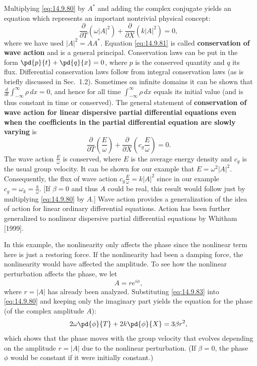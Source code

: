 Multiplying \eqref{eq:14.9.80} by $A^*$ and adding the complex conjugate yields an equation which represents an important nontrivial physical concept:
\begin{equation}
\boxed{\frac{\partial}{\partial T}(\omega|A|^2) + \frac{\partial}{\partial X}(k|A|^2) = 0,}
\label{eq:14.9.81}
\end{equation}
where we have used $|A|^2 = AA^*$. Equation \eqref{eq:14.9.81} is called \textbf{conservation of wave action} and is a general principal. Conservation laws can be put in the form $\pd{p}{t} + \pd{q}{x} = 0$, where $p$ is the conserved quantity and $q$ its flux. Differential conservation laws follow from integral conservation laws (as is briefly discussed in Sec.\ 1.2). Sometimes on infinite domains it can be shown that $\frac{d}{d t}\int_{-\infty}^{\infty}\rho\,dx = 0$, and hence for all time $\int_{-\infty}^{\infty}\rho\,dx$ equals its initial value (and is thus constant in time or conserved). The general statement of \textbf{conservation of wave action for linear dispersive partial differential equations even when the coefficients in the partial differential equation are slowly varying} is
\begin{equation}
\boxed{\frac{\partial}{\partial T}\left(\frac{E}{\omega}\right) + \frac{\partial}{\partial X}\left(c_g\frac{E}{\omega}\right) = 0.}
\label{eq:14.9.82}
\end{equation}
The wave action $\frac{E}{\omega}$ is conserved, where $E$ is the average energy density and $c_g$ is the usual group velocity. It can be shown for our example that $E = \omega^2|A|^2$. Consequently, the flux of wave action $c_g\frac{E}{\omega} = k|A|^2$ since in our example $c_g = \omega_k = \frac{k}{\omega}$. [If $\beta = 0$ and thus $A$ could be real, this result would follow just by multiplying \eqref{eq:14.9.80} by $A$.] Wave action provides a generalization of the idea of action for linear ordinary differential equations. Action has been further generalized to nonlinear dispersive partial differential equations by Whitham [1999].

In this example, the nonlinearity only affects the phase since the nonlinear term here is just a restoring force. If the nonlinearity had been a damping force, the nonlinearity would have affected the amplitude. To see how the nonlinear perturbation affects the phase, we let
\begin{equation}
A = re^{i\phi},
\label{eq:14.9.83}
\end{equation}
where $r = |A|$ has already been analyzed. Substituting \eqref{eq:14.9.83} into \eqref{eq:14.9.80} and keeping only the imaginary part yields the equation for the phase (of the complex amplitude $A$):
\begin{equation}
2\omega\pd{\phi}{T} + 2k\pd{\phi}{X} = 3\beta r^2,
\label{eq:14.9.84}
\end{equation}
which shows that the phase moves with the group velocity that evolves depending on the amplitude $r = |A|$ due to the nonlinear perturbation. (If $\beta = 0$, the phase $\phi$ would be constant if it were initially constant.)

